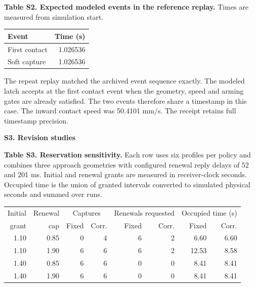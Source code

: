 \documentclass[10pt,letterpaper]{article}
\begin{document}
\textbf{Table S2. Expected modeled events in the reference replay.}
Times are measured from simulation start.

\begin{center}
\begin{tabular}{@{}lr@{}}
\toprule
Event & Time (s) \\
\midrule
First contact & 1.026536 \\
Soft capture & 1.026536 \\
\bottomrule
\end{tabular}
\end{center}

The repeat replay matched the archived event sequence exactly. The modeled latch accepts at the first contact event when the geometry, speed and arming gates are already satisfied. The two events therefore share a timestamp in this case. The inward contact speed was 50.4101 mm/s. The receipt retains full timestamp precision.

\newpage

{\large\bfseries S3. Revision studies\par}

\textbf{Table S3. Reservation sensitivity.} Each row uses six profiles per policy and combines three approach geometries with configured renewal reply delays of 52 and 201 ms. Initial and renewal grants are measured in receiver-clock seconds. Occupied time is the union of granted intervals converted to simulated physical seconds and summed over runs.

\begin{center}
\begin{tabular}{@{}rrrrrrrr@{}}
\toprule
Initial & Renewal & \multicolumn{2}{c}{Captures} & \multicolumn{2}{c}{Renewals requested} &
  \multicolumn{2}{c}{Occupied time (s)} \\
grant & cap & Fixed & Corr. & Fixed & Corr. & Fixed & Corr. \\
\midrule
1.10 & 0.85 & 0 & 4 & 6 & 2 & 6.60 & 6.60 \\
1.10 & 1.90 & 6 & 6 & 6 & 2 & 12.53 & 8.58 \\
1.40 & 0.85 & 6 & 6 & 0 & 0 & 8.41 & 8.41 \\
1.40 & 1.90 & 6 & 6 & 0 & 0 & 8.41 & 8.41 \\
\bottomrule
\end{tabular}
\end{center}
\end{document}
